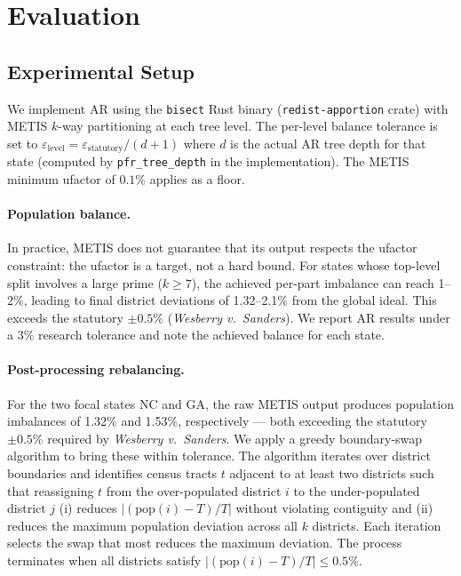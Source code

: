 \section{Evaluation}
\label{sec:evaluation}

\subsection{Experimental Setup}
\label{sec:eval:setup}

We implement AR using the \texttt{bisect} Rust binary (\texttt{redist-apportion}
crate) with METIS $k$-way partitioning at each tree level. The per-level balance
tolerance is set to $\varepsilon_{\text{level}} = \varepsilon_{\text{statutory}} /
(d+1)$ where $d$ is the actual AR tree depth for that state (computed by
\texttt{pfr\_tree\_depth} in the implementation). The METIS minimum ufactor of
$0.1\%$ applies as a floor.

\paragraph{Population balance.}
In practice, METIS does not guarantee that its output respects the ufactor
constraint: the ufactor is a target, not a hard bound. For states whose
top-level split involves a large prime ($k \geq 7$), the achieved per-part
imbalance can reach 1--2\%, leading to final district deviations of 1.32--2.1\%
from the global ideal. This exceeds the statutory $\pm 0.5\%$
(\emph{Wesberry v.\ Sanders}). We report AR results under a $3\%$ research
tolerance and note the achieved balance for each state.

\paragraph{Post-processing rebalancing.}
For the two focal states NC and GA, the raw METIS output produces population
imbalances of 1.32\% and 1.53\%, respectively --- both exceeding the statutory
$\pm 0.5\%$ required by \emph{Wesberry v.\ Sanders}.
We apply a greedy boundary-swap algorithm to bring these within tolerance.
The algorithm iterates over district boundaries and identifies census tracts
$t$ adjacent to at least two districts such that reassigning $t$ from the
over-populated district $i$ to the under-populated district $j$ (i) reduces
$|(\mathrm{pop}(i) - T) / T|$ without violating contiguity and (ii) reduces
the maximum population deviation across all $k$ districts.
Each iteration selects the swap that most reduces the maximum deviation.
The process terminates when all districts satisfy $|(\mathrm{pop}(i) - T)/T| \leq 0.5\%$.

